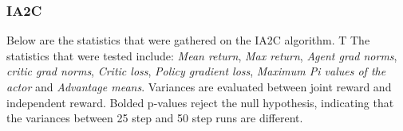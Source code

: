 \documentclass[systems,article,submit,pdftex,moreauthors]{Definitions/mdpi}
\begin{document}
\subsubsection*{IA2C}
Below are the statistics that were gathered on the IA2C algorithm. T The statistics that were tested include: \textit{Mean return}, \textit{Max return}, \textit{Agent grad norms}, \textit{critic grad norms}, \textit{Critic loss}, \textit{Policy gradient loss}, \textit{Maximum Pi values of the actor} and \textit{Advantage means}.
Variances are evaluated between joint reward and independent reward. Bolded p-values reject the null hypothesis, indicating that the variances between 25 step and 50 step runs are different.

\begin{table}[!h]
\caption{P-values of Bartlett's test for homogeneity of variances for mean return values of IA2C between 25 timesteps and 50 timesteps.}
\label{tab:ia2c-return-mean-mean}
\end{table}


\begin{table}[!h]
\caption{P-values of Bartlett's test for homogeneity of variances for max return values of IA2C between 25 timesteps and 50 timesteps.}
\label{tab:ia2c-max-returns}
\end{table}
\end{document}
